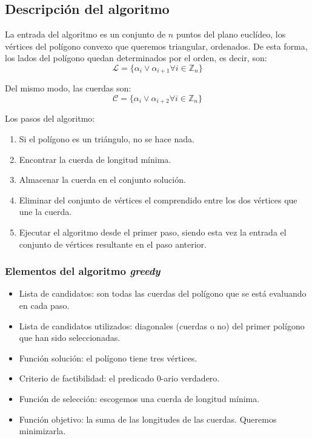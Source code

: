 \documentclass[a4paper, 11pt]{article}
\begin{document}
\subsection{Descripción del algoritmo}
La entrada del algoritmo es un conjunto de $n$ puntos del plano euclídeo, los vértices del polígono convexo que queremos triangular, ordenados. De esta forma, los lados del polígono quedan determinados por el orden, es decir, son: 
\[\mathcal{L} = \{\alpha_i \vee \alpha_{i+1} \forall i\in \mathbb{Z}_n\}\]

Del mismo modo, las cuerdas son:
\[\mathcal{C} = \{\alpha_i \vee \alpha_{i+2} \forall i\in \mathbb{Z}_n\}\]

Los pasos del algoritmo:

\begin{enumerate}
    \item Si el polígono es un triángulo, no se hace nada.
	\item Encontrar la cuerda de longitud mínima.
	\item Almacenar la cuerda en el conjunto solución.
	\item Eliminar del conjunto de vértices el comprendido entre los dos vértices que une la cuerda.
	\item Ejecutar el algoritmo desde el primer paso, siendo esta vez la entrada el conjunto de vértices resultante en el paso anterior.
\end{enumerate}

\subsubsection{Elementos del algoritmo \textit{greedy}}
\begin{itemize}
\item Lista de candidatos: son todas las cuerdas del polígono que se está evaluando en cada paso.                                     

\item Lista de candidatos utilizados: diagonales (cuerdas o no) del primer polígono que han sido seleccionadas.                                                                         

\item Función solución: el polígono tiene tres vértices.

\item Criterio de factibilidad: el predicado $0$-ario verdadero.

\item Función de selección: escogemos una cuerda de longitud mínima.                      

\item Función objetivo: la suma de las longitudes de las cuerdas. Queremos minimizarla.
\end{itemize}
\end{document}
